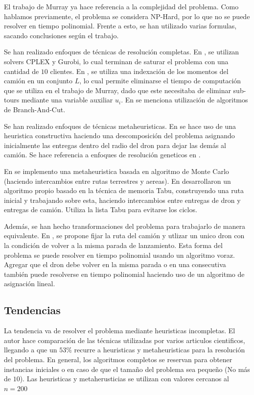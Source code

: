 El trabajo de Murray ya hace referencia a la complejidad del problema. Como hablamos previamente, el problema se considera NP-Hard, por lo que no se puede resolver en tiempo polinomial. Frente a esto, se han utilizado varias formulas, sacando conclusiones según el trabajo.

Se han realizado enfoques de técnicas de resolución completas. En \cite{Murray2015Flying}, se utilizan solvers CPLEX y Gurobi, lo cual terminan de saturar el problema con una cantidad de $10$ clientes. En \cite{freitas2021exact}, se utiliza una indexación de los momentos del camión en un conjunto $L$, lo cual permite eliminarse el tiempo de computación que se utiliza en el trabajo de Murray, dado que este necesitaba de eliminar sub-tours mediante una variable auxiliar $u_i$. En \cite{moshrefjavadi2021applications} se menciona utilización de algoritmos de Branch-And-Cut.

Se han realizado enfoques de técnicas metaheuristicas. En \cite{freitas2021exact} se hace uso de una heuristica constructiva haciendo una descomposición del problema asignando inicialmente las entregas dentro del radio del dron para dejar las demás al camión. Se hace referencia a enfoques de resolución geneticos en \cite{moshrefjavadi2021applications}.

En \cite{ponza2016optimization} se implemento una metaheuristica basada en algoritmo de Monte Carlo (haciendo intercambios entre rutas terrestres y aereas). En \cite{freitas2021exact} desarrollaron un algoritmo propio basado en la técnica de memoria Tabu, construyendo una ruta inicial y trabajando sobre esta, haciendo intercambios entre entregas de dron y entregas de camión. Utiliza la lista Tabu para evitarse los ciclos.

Además, se han hecho transformaciones del problema para trabajarlo de manera equivalente. En \cite{boysen2018drone}, se propone fijar la ruta del camión y utlizar un unico dron con la condición de volver a la misma parada de lanzamiento. Esta forma del problema se puede resolver en tiempo polinomial usando un algoritmo voraz. Agregar que el dron debe volver en la misma parada o en una consecutiva también puede resolverse en tiempo polinomial haciendo uso de un algoritmo de asignación lineal.

\subsection{Tendencias}

La tendencia va de resolver el problema mediante heuristicas incompletas. El autor \cite{moshrefjavadi2021applications} hace comparación de las técnicas utilizadas por varios articulos cientificos, llegando a que un $53\%$ recurre a heuristicas y metaheuristicas para la resolución del problema. En general, los algoritmos completos se reservan para obtener instancias iniciales o en caso de que el tamaño del problema sea pequeño (No más de $10$). Las heuristicas y metaherusticias se utilizan con valores cercanos al $n=200$

